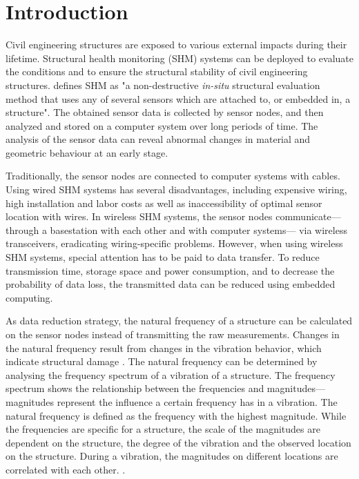 \documentclass[12pt,a4paper]{scrartcl}
\begin{document}

\section*{Introduction}

Civil engineering structures are exposed to various external impacts during their lifetime. 
Structural health monitoring (SHM) systems can be deployed to evaluate the conditions and to ensure the structural stability of civil engineering structures.
\citet{BisbySHM} defines SHM as "a non-destructive \textit{in-situ} structural evaluation method that uses any of several sensors which are attached to, or embedded in, a structure".
The obtained sensor data is collected by sensor nodes, and then analyzed and stored on a computer system over long periods of time. 
The analysis of the sensor data can reveal abnormal changes in material and geometric behaviour at an early stage.

Traditionally, the sensor nodes are connected to computer systems with cables.
Using wired SHM systems has several disadvantages, including expensive wiring, high installation and labor costs as well as inaccessibility of optimal sensor location with wires.
In wireless SHM systems, the sensor nodes communicate---through a basestation with each other and with computer systems--- via wireless transceivers, eradicating wiring-specific problems. However, when using wireless SHM systems, special attention has to be paid to data transfer. 
To reduce transmission time, storage space and power consumption, and to decrease the probability of data loss, the transmitted data can be reduced using embedded computing.

As data reduction strategy, the natural frequency of a structure can be calculated on the sensor nodes instead of transmitting the raw measurements.
Changes in the natural frequency result from changes in the vibration behavior, which indicate structural damage \citep{salawu1997detection}.
The natural frequency can be determined by analysing the frequency spectrum of a vibration of a structure.
The frequency spectrum shows the relationship between the frequencies and magnitudes---magnitudes represent the influence a certain frequency has in a vibration.
The natural frequency is defined as the frequency with the highest magnitude.
While the frequencies are specific for a structure, the scale of the magnitudes are dependent on the structure, the degree of the vibration and the observed location on the structure.
During a vibration, the magnitudes on different locations are correlated with each other.
\citep{rao2011fast}.
\end{document}

